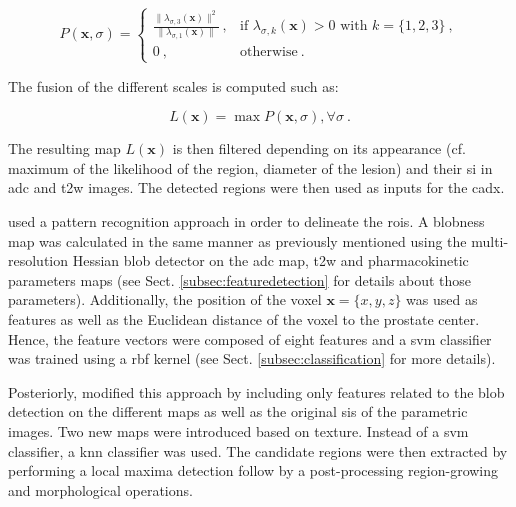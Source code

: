 \begin{equation}
P(\mathbf{x},\sigma) = \begin{cases}
	\frac{\| \lambda_{\sigma,3}(\mathbf{x}) \|^{2}}{\| \lambda_{\sigma,1} (\mathbf{x}) \|} \ , & \text{if } \lambda_{\sigma,k}(\mathbf{x}) > 0 \text{ with } k = \{1,2,3\} \  , \\
	0 \ , & \text{otherwise} \ .
\end{cases}
\label{eq:blobdet}
\end{equation}

The fusion of the different scales is computed such as:

\begin{equation}
	L(\mathbf{x}) = \max P(\mathbf{x},\sigma) , \forall \sigma \ .
	\label{eq:fusionBlob}
\end{equation}

The resulting map $L(\mathbf{x})$ is then filtered depending on its appearance (cf. maximum of the likelihood of the region, diameter of the lesion) and their \ac{si} in \ac{adc} and \ac{t2w} images. The detected regions were then used as inputs for the \ac{cadx}.

\cite{Litjens2011} used a pattern recognition approach in order to delineate the \acp{roi}. A blobness map was calculated in the same manner as previously mentioned using the multi-resolution Hessian blob detector on the \ac{adc} map, \ac{t2w} and pharmacokinetic parameters maps (see Sect. \ref{subsec:featuredetection} for details about those parameters). Additionally, the position of the voxel $\mathbf{x}=\{x,y,z\}$ was used as features as well as the Euclidean distance of the voxel to the prostate center. Hence, the feature vectors were composed of eight features and a \ac{svm} classifier was trained using a \ac{rbf} kernel (see Sect. \ref{subsec:classification} for more details).

Posteriorly, \cite{Litjens2012} modified this approach by including only features related to the blob detection on the different maps as well as the original \acp{si} of the parametric images. Two new maps were introduced based on texture. Instead of a \ac{svm} classifier, a \ac{knn} classifier was used. The candidate regions were then extracted by performing a local maxima detection follow by a post-processing region-growing and morphological operations. 